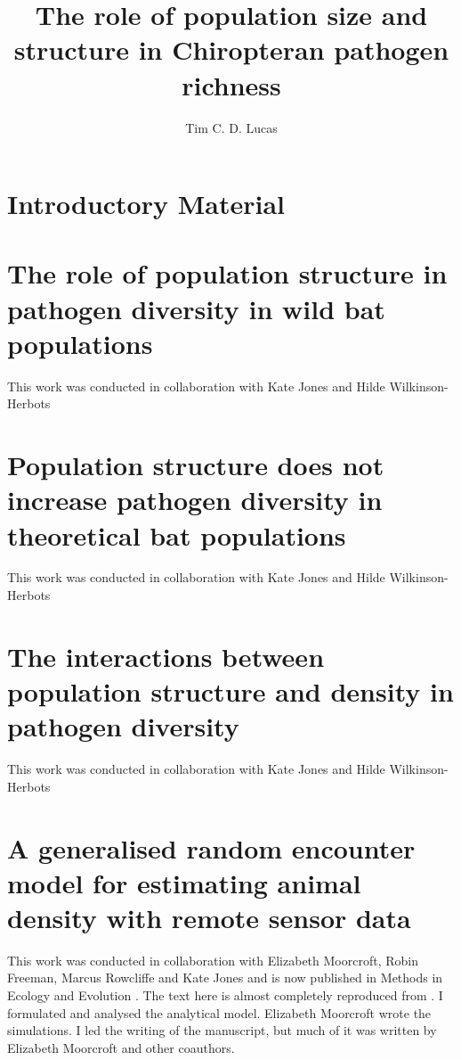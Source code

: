 \documentclass[11pt,phd,a4paper,oneside]{stanley}
\title{The role of population size and structure in Chiropteran pathogen richness}
\author{Tim C. D. Lucas}
\begin{document}



\chapter{Introductory Material}
\label{ch:intro}


\chapter{The role of population structure in pathogen diversity in wild bat populations}{This work was conducted in collaboration with Kate Jones and Hilde Wilkinson-Herbots}

\label{ch:empirical}


\chapter{Population structure does not increase pathogen diversity in theoretical bat populations}{This work was conducted in collaboration with Kate Jones and Hilde Wilkinson-Herbots}
\label{ch:sims1}


\chapter{The interactions between population structure and density in pathogen diversity}{This work was conducted in collaboration with Kate Jones and Hilde Wilkinson-Herbots}
\label{ch:sims2}



\chapter[gREM for estimating animal density]{A generalised random encounter model for estimating animal density with remote sensor data}{
This work was conducted in collaboration with Elizabeth Moorcroft, Robin Freeman, Marcus Rowcliffe and Kate Jones and is now published in Methods in Ecology and Evolution \cite{lucas2015generalised}.
The text here is almost completely reproduced from \textcite{lucas2015generalised}.
I formulated and analysed the analytical model.
Elizabeth Moorcroft wrote the simulations.
I led the writing of the manuscript, but much of it was written by Elizabeth Moorcroft and other coauthors.
}
\label{ch:grem}

\end{document}
